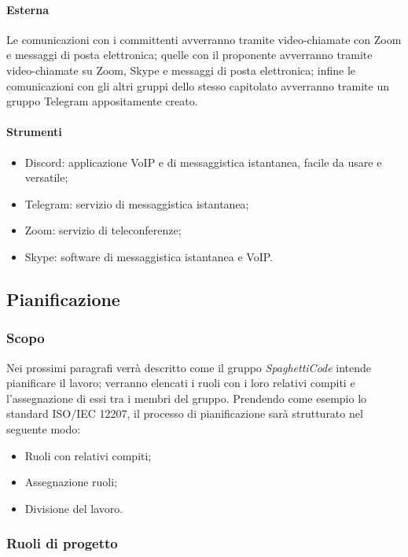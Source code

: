 \paragraph{Esterna}

Le comunicazioni con i committenti avverranno tramite video-chiamate con Zoom e messaggi di posta elettronica; 
quelle con il proponente avverranno tramite video-chiamate su Zoom, Skype e messaggi di posta elettronica; infine 
le comunicazioni con gli altri gruppi dello stesso capitolato avverranno tramite un gruppo Telegram appositamente 
creato.

\paragraph{Strumenti}

\begin{itemize}
    \item Discord: applicazione VoIP e di messaggistica istantanea, facile da usare e versatile;
    \item Telegram: servizio di messaggistica istantanea;
    \item Zoom: servizio di teleconferenze;
    \item Skype: software di messaggistica istantanea e VoIP.
\end{itemize}

\subsection{Pianificazione}

\subsubsection{Scopo}

Nei prossimi paragrafi verrà descritto come il gruppo \emph{SpaghettiCode} intende pianificare il lavoro; verranno 
elencati i ruoli con i loro relativi compiti e l'assegnazione di essi tra i membri del gruppo. Prendendo come esempio 
lo standard ISO/IEC 12207, il processo di pianificazione sarà strutturato nel seguente modo:
\begin{itemize}
    \item Ruoli con relativi compiti;
    \item Assegnazione ruoli;
    \item Divisione del lavoro.
\end{itemize}

\subsubsection{Ruoli di progetto}

